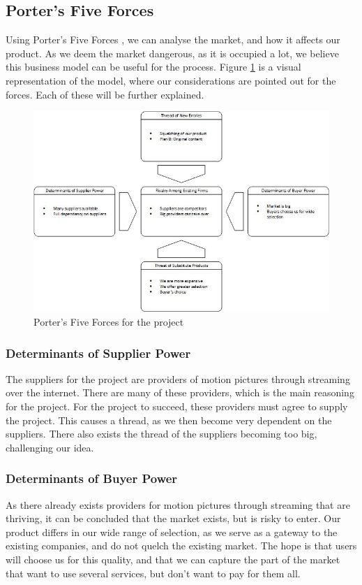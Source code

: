 \subsection{Porter's Five Forces}

Using Porter's Five Forces \cite{fiveForces}, we can analyse the market, and how it affects our product. As we deem the market dangerous, as it is occupied a lot, we believe this business model can be useful for the process. Figure \ref{fig:five_forces} is a visual representation of the model, where our considerations are pointed out for the forces. Each of these will be further explained.

\begin{figure}[h]
    \begin{center}
        \includegraphics[scale=0.65]{./pics/five_forces}
        \caption{Porter's Five Forces for the project}
        \label{fig:five_forces}
    \end{center}
\end{figure}

\subsubsection*{Determinants of Supplier Power}
The suppliers for the project are providers of motion pictures through streaming over the internet. There are many of these providers, which is the main reasoning for the project. For the project to succeed, these providers must agree to supply the project. This causes a thread, as we then become very dependent on the suppliers. There also exists the thread of the suppliers becoming too big, challenging our idea.

\subsubsection*{Determinants of Buyer Power}
As there already exists providers for motion pictures through streaming that are thriving, it can be concluded that the market exists, but is risky to enter. Our product differs in our wide range of selection, as we serve as a gateway to the existing companies, and do not quelch the existing market. The hope is that users will choose us for this quality, and that we can capture the part of the market that want to use several services, but don't want to pay for them all.

